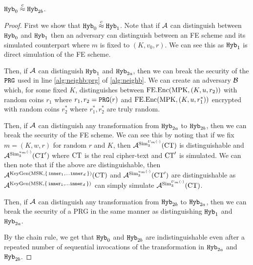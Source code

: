 \begin{lemma}
	\label{lem:hybrOneToFour}
	$\texttt{Hyb}_0 \overset{c}{\approx} \texttt{Hyb}_{2b}$.	
	\begin{proof}
		First we show that $\texttt{Hyb}_0 \overset{c}{\approx} \texttt{Hyb}_1$. Note that if $\mathcal{A}$ can distinguish
		between $\texttt{Hyb}_0$ and $\texttt{Hyb}_1$ then an adversary can distinguish between an FE scheme and its simulated counterpart
		where $m$ is fixed to $(K, v_0, r)$. We can see this as $\texttt{Hyb}_1$ is  direct simulation of the FE scheme.

		Then, if $\mathcal{A}$ can distinguish $\texttt{Hyb}_1$ and $\texttt{Hyb}_{2a}$, then we can break the security of the $\texttt{PRG}$ used in line \ref{alg:neighb:prg} of \cref{alg:neighb}.
		We can create an adversary $\mathcal{B}$ which, for some fixed $K$, distinguishes between $\text{FE.Enc}(\text{MPK}, (K, u, r_2))$ with random coins $r_1$ where $r_1, r_2 = \texttt{PRG}(r)$
		and $\text{FE.Enc}(\text{MPK}, (K, u, r_1^*))$ encrypted with random coins $r_2^*$ where $r_1^*, r_2^*$ are truly random.

		Then, if $\mathcal{A}$ can distinguish any transformation from $\texttt{Hyb}_{2a}$ to $\texttt{Hyb}_{2b}$, then we can break the security of the FE scheme.
		We can see this by noting that if we fix $m = (K, w, r)$ for random $r$ and $K$,
		then $\mathcal{A}^{\text{Sim}_3^{U_m(\cdot)}}(\text{CT})$ is distinguishable
		and $\mathcal{A}^{\text{Sim}_3^{u_m(\cdot)}}(\text{CT}')$ where $\text{CT}$ is the real cipher-text and $\text{CT}'$ is simulated.
		We can then note that if the above are distinguishable, then
		$\mathcal{A}^{\text{KeyGen}(\text{MSK}, \set{\texttt{inner}_1, \dots \texttt{inner}_d})}(\text{CT})$ 
		and $\mathcal{A}^{\text{Sim}_3^{u_m(\cdot)}}(\text{CT}')$ are distinguishable
		as $\mathcal{A}^{\text{KeyGen}(\text{MSK}, \set{\texttt{inner}_1, \dots \texttt{inner}_d})}$ can simply simulate
		$\mathcal{A}^{\text{Sim}_3^{U_m(\cdot)}}(\text{CT})$.

		Then, if $\mathcal{A}$ can distinguish any transformation from $\texttt{Hyb}_{2b}$ to $\texttt{Hyb}_{2a}$, then we can break the security of a PRG
		in the same manner as distinguishing $\texttt{Hyb}_1$ and $\texttt{Hyb}_{2a}$.

		By the chain rule, we get that $\texttt{Hyb}_0$ and $\texttt{Hyb}_{2b}$ are indistinguishable even after a repeated
		number of sequential invocations of the transformation in $\texttt{Hyb}_{2a}$ and $\texttt{Hyb}_{2b}$.
	\end{proof}
\end{lemma}


